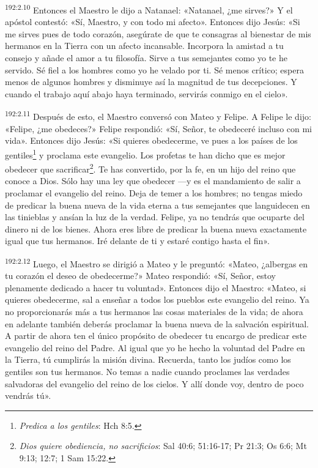 \par 
\textsuperscript{192:2.10} Entonces el Maestro le dijo a Natanael: «Natanael, ¿me sirves?» Y el apóstol contestó: «Sí, Maestro, y con todo mi afecto». Entonces dijo Jesús: «Si me sirves pues de todo corazón, asegúrate de que te consagras al bienestar de mis hermanos en la Tierra con un afecto incansable. Incorpora la amistad a tu consejo y añade el amor a tu filosofía. Sirve a tus semejantes como yo te he servido. Sé fiel a los hombres como yo he velado por ti. Sé menos crítico; espera menos de algunos hombres y disminuye así la magnitud de tus decepciones. Y cuando el trabajo aquí abajo haya terminado, servirás conmigo en el cielo».

\par 
\textsuperscript{192:2.11} Después de esto, el Maestro conversó con Mateo y Felipe. A Felipe le dijo: «Felipe, ¿me obedeces?» Felipe respondió: «Sí, Señor, te obedeceré incluso con mi vida». Entonces dijo Jesús: «Si quieres obedecerme, ve pues a los países de los gentiles\footnote{\textit{Predica a los gentiles}: Hch 8:5.} y proclama este evangelio. Los profetas te han dicho que es mejor obedecer que sacrificar\footnote{\textit{Dios quiere obediencia, no sacrificios}: Sal 40:6; 51:16-17; Pr 21:3; Os 6:6; Mt 9:13; 12:7; 1 Sam 15:22.}. Te has convertido, por la fe, en un hijo del reino que conoce a Dios. Sólo hay una ley que obedecer ---y es el mandamiento de salir a proclamar el evangelio del reino. Deja de temer a los hombres; no tengas miedo de predicar la buena nueva de la vida eterna a tus semejantes que languidecen en las tinieblas y ansían la luz de la verdad. Felipe, ya no tendrás que ocuparte del dinero ni de los bienes. Ahora eres libre de predicar la buena nueva exactamente igual que tus hermanos. Iré delante de ti y estaré contigo hasta el fin».

\par 
\textsuperscript{192:2.12} Luego, el Maestro se dirigió a Mateo y le preguntó: «Mateo, ¿albergas en tu corazón el deseo de obedecerme?» Mateo respondió: «Sí, Señor, estoy plenamente dedicado a hacer tu voluntad». Entonces dijo el Maestro: «Mateo, si quieres obedecerme, sal a enseñar a todos los pueblos este evangelio del reino. Ya no proporcionarás más a tus hermanos las cosas materiales de la vida; de ahora en adelante también deberás proclamar la buena nueva de la salvación espiritual. A partir de ahora ten el único propósito de obedecer tu encargo de predicar este evangelio del reino del Padre. Al igual que yo he hecho la voluntad del Padre en la Tierra, tú cumplirás la misión divina. Recuerda, tanto los judíos como los gentiles son tus hermanos. No temas a nadie cuando proclames las verdades salvadoras del evangelio del reino de los cielos. Y allí donde voy, dentro de poco vendrás tú».

